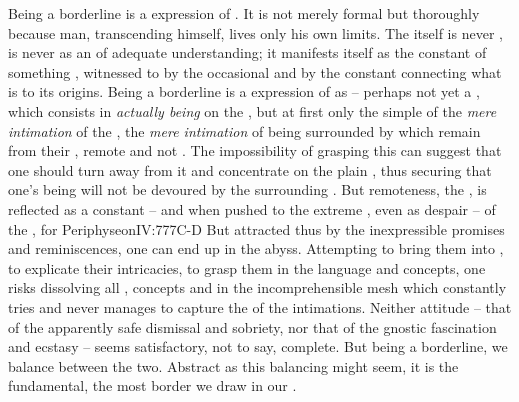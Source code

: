 Being a borderline is a  expression of . It is not merely formal but thoroughly  because
man, transcending himself, lives only his own limits.  The 
itself is never , is never  as an
 of adequate understanding; it manifests itself as the constant
 of something , witnessed to by the occasional 
and by the constant  connecting what is  to its
 origins. Being a borderline is a  expression of
 as  -- perhaps not yet a , which consists in {\em actually being} on the , but
at first only the simple  of the {\em mere intimation} of the
, the {\em mere intimation} of being surrounded by 
which remain  from their , remote and not . The impossibility of grasping this  can suggest that
one should turn away from it and concentrate on the plain , thus
securing that one's being will not be devoured by the surrounding .
But remoteness, the , is reflected as a constant  -- and
when pushed to the extreme , even as despair -- of the
, for \citet{the desire for the bliss, which she had lost, remained
  with her even after the
  Fall.}{Periphyseon}{IV:777C-D\label{ftnt:afterFall}} But attracted
thus by the inexpressible promises and  reminiscences, one can end up
in the abyss. Attempting to bring them into , to explicate their
intricacies, to grasp them in the language and concepts, one risks dissolving
all , concepts and  in the incomprehensible mesh which
constantly tries and never manages to capture the  of the
 intimations. Neither attitude -- that of the apparently safe
dismissal and sobriety, nor that of the gnostic fascination and ecstasy -- seems
satisfactory, not to say, complete. But being a borderline, we balance between
the two. Abstract as this balancing might seem, it is the fundamental, the most
 border we draw in our .
%


